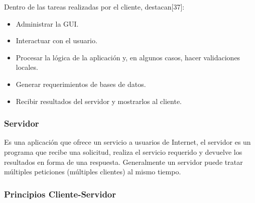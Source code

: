 Dentro de las tareas realizadas por el cliente, destacan[37]:
\begin{itemize}
 \item Administrar la GUI.
 \item Interactuar con el usuario.
 \item Procesar la lógica de la aplicación y, en algunos casos, hacer validaciones locales.
 \item Generar requerimientos de bases de datos.
 \item Recibir resultados del servidor y mostrarlos al cliente.
\end{itemize}




\subsubsection{Servidor}

Es una aplicación que ofrece un servicio a usuarios de Internet, el servidor es un programa que recibe una solicitud, realiza el 
servicio requerido y devuelve los resultados en forma de una respuesta. Generalmente un servidor puede tratar múltiples peticiones 
(múltiples clientes) al mismo tiempo.\\


\subsubsection{Principios Cliente-Servidor}

